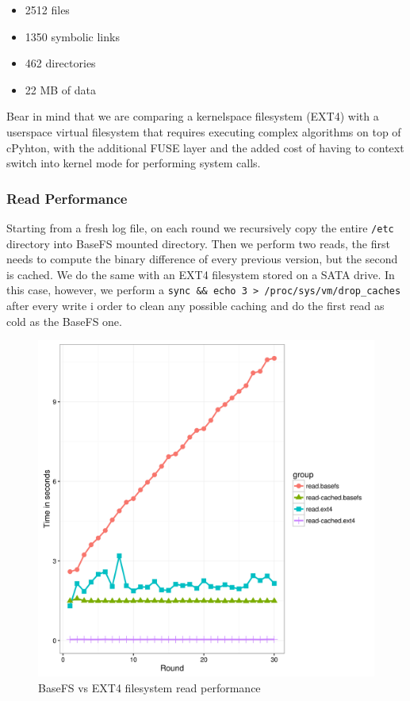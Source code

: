 \documentclass{sig-alternate}
\begin{document}
\begin{itemize}
 \item 2512 files
 \item 1350 symbolic links
 \item 462 directories
 \item 22 MB of data
\end{itemize}
Bear in mind that we are comparing a kernelspace filesystem (EXT4) with a userspace virtual filesystem that requires executing complex algorithms on top of cPyhton, with the additional FUSE layer and the added cost of having to context switch into kernel mode for performing system calls.

\subsubsection{Read Performance}

Starting from a fresh log file, on each round we recursively copy the entire \texttt{/etc} directory into BaseFS mounted directory. Then we perform two reads, the first needs to compute the binary difference of every previous version, but the second is cached. We do the same with an EXT4 filesystem stored on a SATA drive. In this case, however, we perform a \texttt{sync \&\& echo 3 > /proc/sys/vm/drop\_caches} after every write i order to clean any possible caching and do the first read as cold as the BaseFS one.

\begin{figure}[htp]
\centering
\includegraphics[width=\columnwidth]{../eval/plots/read_performance.png}
\caption{BaseFS vs EXT4 filesystem read performance}
\label{fig:read-performance}
\end{figure}
\end{document}

